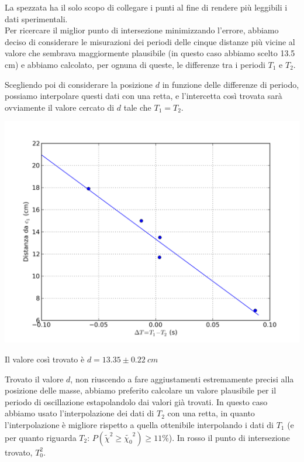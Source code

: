 La spezzata ha il solo scopo di collegare i punti al fine di rendere più leggibili i dati sperimentali.\\

Per ricercare il miglior punto di intersezione minimizzando l'errore, abbiamo deciso di considerare le misurazioni dei periodi delle cinque distanze più vicine al valore che sembrava maggiormente plausibile (in questo caso abbiamo scelto 13.5 cm) e abbiamo calcolato, per ognuna di queste, le differenze tra i periodi $T_1$ e $T_2$.

Scegliendo poi di considerare la posizione $d$ in funzione delle differenze di periodo, possiamo interpolare questi dati con una retta, e l'intercetta così trovata sarà ovviamente il valore cercato di $d$ tale che $T_1 = T_2$.

\begin{center}
\includegraphics[scale=0.60]{../grafici/kater/intercetta.png}
\end{center}
Il valore così trovato è $d = 13.35 \pm 0.22\ cm$

Trovato il valore $d$, non riuscendo a fare aggiustamenti estremamente precisi alla posizione delle masse, abbiamo preferito calcolare un valore plausibile per il periodo di oscillazione estapolandolo dai valori già trovati. In questo caso abbiamo usato l'interpolazione dei dati di $T_2$ con una retta, in quanto l'interpolazione è migliore rispetto a quella ottenibile interpolando i dati di $T_1$ (e per quanto riguarda $T_2$: $P(\tilde{\chi}^2 \geq \tilde{\chi_0}^2) \geq 11\%$).
In rosso il punto di intersezione trovato, $T^2_0$.

